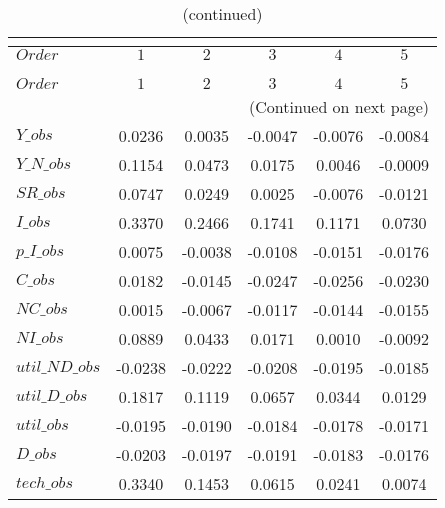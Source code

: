  
\begin{center}
\begin{longtable}{lccccc} 
\caption{COEFFICIENTS OF AUTOCORRELATION}\\
 \label{Table:th_autocorr_matrix}\\
\toprule 
$Order          $	 & 	 $          1$	 & 	 $          2$	 & 	 $          3$	 & 	 $          4$	 & 	 $          5$\\
\midrule \endfirsthead 
\caption{(continued)}\\
 \toprule \\ 
$Order          $	 & 	 $          1$	 & 	 $          2$	 & 	 $          3$	 & 	 $          4$	 & 	 $          5$\\
\midrule \endhead 
\midrule \multicolumn{6}{r}{(Continued on next page)} \\ \bottomrule \endfoot 
\bottomrule \endlastfoot 
$Y\_obs         $	 & 	     0.0236	 & 	     0.0035	 & 	    -0.0047	 & 	    -0.0076	 & 	    -0.0084 \\ 
$Y\_N\_obs      $	 & 	     0.1154	 & 	     0.0473	 & 	     0.0175	 & 	     0.0046	 & 	    -0.0009 \\ 
$SR\_obs        $	 & 	     0.0747	 & 	     0.0249	 & 	     0.0025	 & 	    -0.0076	 & 	    -0.0121 \\ 
$I\_obs         $	 & 	     0.3370	 & 	     0.2466	 & 	     0.1741	 & 	     0.1171	 & 	     0.0730 \\ 
$p\_I\_obs      $	 & 	     0.0075	 & 	    -0.0038	 & 	    -0.0108	 & 	    -0.0151	 & 	    -0.0176 \\ 
$C\_obs         $	 & 	     0.0182	 & 	    -0.0145	 & 	    -0.0247	 & 	    -0.0256	 & 	    -0.0230 \\ 
$NC\_obs        $	 & 	     0.0015	 & 	    -0.0067	 & 	    -0.0117	 & 	    -0.0144	 & 	    -0.0155 \\ 
$NI\_obs        $	 & 	     0.0889	 & 	     0.0433	 & 	     0.0171	 & 	     0.0010	 & 	    -0.0092 \\ 
$util\_ND\_obs  $	 & 	    -0.0238	 & 	    -0.0222	 & 	    -0.0208	 & 	    -0.0195	 & 	    -0.0185 \\ 
$util\_D\_obs   $	 & 	     0.1817	 & 	     0.1119	 & 	     0.0657	 & 	     0.0344	 & 	     0.0129 \\ 
$util\_obs      $	 & 	    -0.0195	 & 	    -0.0190	 & 	    -0.0184	 & 	    -0.0178	 & 	    -0.0171 \\ 
$D\_obs         $	 & 	    -0.0203	 & 	    -0.0197	 & 	    -0.0191	 & 	    -0.0183	 & 	    -0.0176 \\ 
$tech\_obs      $	 & 	     0.3340	 & 	     0.1453	 & 	     0.0615	 & 	     0.0241	 & 	     0.0074 \\ 
\end{longtable}
 \end{center}
